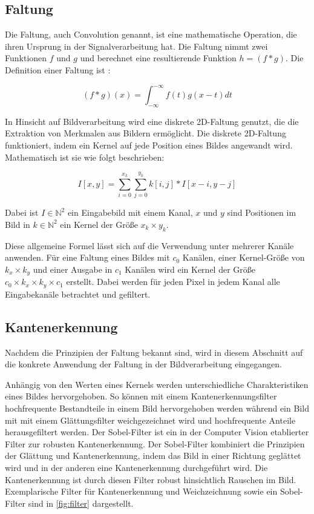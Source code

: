 \subsection{Faltung}
\label{sec:was_filterung}

Die Faltung, auch Convolution genannt, ist eine mathematische Operation, die ihren Ursprung in der Signalverarbeitung hat. Die Faltung nimmt zwei Funktionen $f$ und $g$ und berechnet eine resultierende Funktion $h = (f * g)$. Die Definition einer Faltung ist \cite{convolution}:

\[ (f*g)(x) = \int_{-\infty}^{-\infty} f(t) g(x-t) dt\]

In Hinsicht auf Bildverarbeitung wird eine diskrete 2D-Faltung genutzt, die die Extraktion von Merkmalen aus Bildern ermöglicht. Die diskrete 2D-Faltung funktioniert, indem ein Kernel auf jede Position eines Bildes angewandt wird. Mathematisch ist sie wie folgt beschrieben:

\[ I[x, y] = \sum_{i=0}^{x_k} \sum_{j=0}^{y_k} k[i, j] * I[x-i, y-j] \]


Dabei ist $I \in \mathbb{N}^2$ ein Eingabebild mit einem Kanal, $x$ und $y$ sind Positionen im Bild in $k \in \mathbb{N}^2$ ein Kernel der Größe $x_k \times y_k$.

Diese allgemeine Formel lässt sich auf die Verwendung unter mehrerer Kanäle anwenden. Für eine Faltung eines Bildes mit $c_0$ Kanälen, einer Kernel-Größe von $k_x \times k_y$ und einer Ausgabe in $c_1$ Kanälen wird ein Kernel der Größe $ c_0 \times k_x \times k_y \times c_1$ erstellt. Dabei werden für jeden Pixel in jedem Kanal alle Eingabekanäle betrachtet und gefiltert.

\subsection{Kantenerkennung}
\label{sec:kantenerkennung}

Nachdem die Prinzipien der Faltung bekannt sind, wird in diesem Abschnitt auf die konkrete Anwendung der Faltung in der Bildverarbeitung eingegangen.

Anhängig von den Werten eines Kernels werden unterschiedliche Charakteristiken eines Bildes hervorgehoben. So können mit einem Kantenerkennungsfilter hochfrequente Bestandteile in einem Bild hervorgehoben werden während ein Bild mit mit einem Glättungsfilter weichgezeichnet wird und hochfrequente Anteile herausgefiltert werden. Der Sobel-Filter ist ein in der Computer Vision etablierter Filter zur robusten Kantenerkennung\cite{sobel}. Der Sobel-Filter kombiniert die Prinzipien der Glättung und Kantenerkennung, indem das Bild in einer Richtung geglättet wird und in der anderen eine Kantenerkennung durchgeführt wird. Die Kantenerkennung ist durch diesen Filter robust hinsichtlich Rauschen im Bild. Exemplarische Filter für Kantenerkennung und Weichzeichnung sowie ein Sobel-Filter sind in \autoref{fig:filter} dargestellt.

